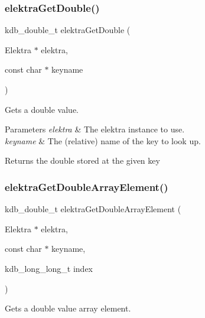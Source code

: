 \subsubsection{\texorpdfstring{elektra\+Get\+Double()}{elektraGetDouble()}}
{\footnotesize\ttfamily kdb\+\_\+double\+\_\+t elektra\+Get\+Double (\begin{DoxyParamCaption}\item[{Elektra $\ast$}]{elektra,  }\item[{const char $\ast$}]{keyname }\end{DoxyParamCaption})}



Gets a double value. 


\begin{DoxyParams}{Parameters}
{\em elektra} & The elektra instance to use. \\
\hline
{\em keyname} & The (relative) name of the key to look up. \\
\hline
\end{DoxyParams}
\begin{DoxyReturn}{Returns}
the double stored at the given key 
\end{DoxyReturn}
\mbox{\label{group__highlevel_ga838e146de1cf41ecd2795654f3d7b4a8}} 
\subsubsection{\texorpdfstring{elektra\+Get\+Double\+Array\+Element()}{elektraGetDoubleArrayElement()}}
{\footnotesize\ttfamily kdb\+\_\+double\+\_\+t elektra\+Get\+Double\+Array\+Element (\begin{DoxyParamCaption}\item[{Elektra $\ast$}]{elektra,  }\item[{const char $\ast$}]{keyname,  }\item[{kdb\+\_\+long\+\_\+long\+\_\+t}]{index }\end{DoxyParamCaption})}



Gets a double value array element. 


